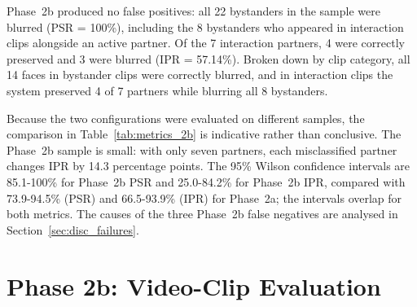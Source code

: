 \begin{table}[htbp]
\begin{singlespace}
\centering
\caption{Classification metrics for the Phase~2a and Phase~2b configurations.}
\label{tab:metrics_2b}
\renewcommand{\arraystretch}{1.3}
\end{singlespace}
\end{table}

Phase~2b produced no false positives: all 22 bystanders in the sample were blurred
(PSR = 100\%), including the 8 bystanders who appeared in interaction clips
alongside an active partner. Of the 7 interaction partners, 4 were correctly
preserved and 3 were blurred (IPR = 57.14\%). Broken down by clip category, all 14
faces in bystander clips were correctly blurred, and in interaction clips the
system preserved 4 of 7 partners while blurring all 8 bystanders.

Because the two configurations were evaluated on different samples, the
comparison in Table~\ref{tab:metrics_2b} is indicative rather than conclusive. The
Phase~2b sample is small: with only seven partners, each misclassified partner
changes IPR by 14.3 percentage points. The 95\% Wilson confidence intervals are
85.1-100\% for Phase~2b PSR and 25.0-84.2\% for Phase~2b IPR, compared with
73.9-94.5\% (PSR) and 66.5-93.9\% (IPR) for Phase~2a; the intervals overlap for
both metrics. The causes of the three Phase~2b false negatives are analysed in
Section~\ref{sec:disc_failures}.

\section{Phase 2b: Video-Clip Evaluation}
\label{sec:results_clips}


